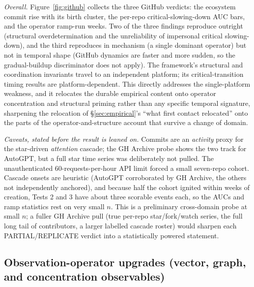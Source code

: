 \documentclass[11pt]{article}
\begin{document}
\emph{Overall.} Figure~\ref{fig:github} collects the three GitHub verdicts: the ecosystem commit rise with its birth cluster, the per-repo critical-slowing-down AUC bars, and the operator ramp-run weeks. Two of the three findings reproduce outright (structural overdetermination and the unreliability of impersonal critical slowing-down), and the third reproduces in mechanism (a single dominant operator) but not in temporal shape (GitHub dynamics are faster and more sudden, so the gradual-buildup discriminator does not apply). The framework's structural and coordination invariants travel to an independent platform; its critical-transition timing results are platform-dependent. This directly addresses the single-platform weakness, and it relocates the durable empirical content onto operator concentration and structural priming rather than any specific temporal signature, sharpening the relocation of \S\ref{sec:empirical}'s ``what first contact relocated'' onto the parts of the operator-and-structure account that survive a change of domain.

\emph{Caveats, stated before the result is leaned on.} Commits are an \emph{activity} proxy for the star-driven \emph{attention} cascade; the GH Archive probe shows the two track for AutoGPT, but a full star time series was deliberately not pulled. The unauthenticated $60$-requests-per-hour API limit forced a small seven-repo cohort. Cascade onsets are heuristic (AutoGPT corroborated by GH Archive, the others not independently anchored), and because half the cohort ignited within weeks of creation, Tests 2 and 3 have about three scorable events each, so the AUCs and ramp statistics rest on very small $n$. This is a preliminary cross-domain probe at small $n$; a fuller GH Archive pull (true per-repo star/fork/watch series, the full long tail of contributors, a larger labelled cascade roster) would sharpen each PARTIAL/REPLICATE verdict into a statistically powered statement.

\subsection{Observation-operator upgrades (vector, graph, and concentration observables)}
\label{sec:obsupgrades}
\end{document}
